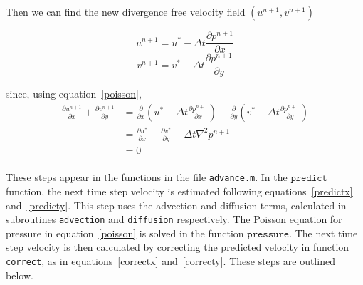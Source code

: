 \documentclass[12pt]{article}
\begin{document}
Then we can find the new divergence free velocity field $(u^{n+1},v^{n+1})$ 

\begin{equation}
u^{n+1}= u^* - \Delta t\frac{\partial p^{n+1}}{\partial x}
\label{correctx}
\end{equation}
\begin{equation}
v^{n+1}= v^* - \Delta t\frac{\partial p^{n+1}}{\partial y}
\label{correcty}
\end{equation}

since, using equation~\ref{poisson},
\begin{align*}
\frac{\partial  u^{n+1}}{\partial x} +  \frac{\partial  v^{n+1}}{\partial y}&= \frac{\partial}{\partial x}\left(u^* - \Delta t\frac{\partial p^{n+1}}{\partial x} \right) + \frac{\partial}{\partial y}\left(v^* - \Delta t\frac{\partial p^{n+1}}{\partial y} \right)\\
&= \frac{\partial u^*}{\partial x} + \frac{\partial v^*}{\partial y} - \Delta t\nabla^2p^{n+1} \\
&= 0 \\
\end{align*}

These steps appear in the functions in the file \texttt{advance.m}.  In the $\texttt{predict}$ function, the next time step velocity is estimated following equations~\ref{predictx} and~\ref{predicty}.  This step uses the advection and diffusion terms, calculated in subroutines \texttt{advection} and \texttt{diffusion} respectively.  The Poisson equation for pressure in equation~\ref{poisson} is solved in the function $\texttt{pressure}$.  The next time step velocity is then calculated by correcting the predicted velocity in function \texttt{correct}, as in equations~\ref{correctx} and~\ref{correcty}.  These steps are outlined below.
\end{document}
